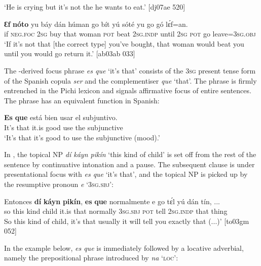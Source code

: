 \glt ‘He is crying but it’s not the he wants to eat.’ [dj07ae 520]
\z


\ea%
    \label{ex:key:712}
    \gll \textbf{Ɛf}  \textbf{nóto}  yu  báy  dán  húman  go  bít    yú    sóté  
yu  go  gó  lɛ́f=an.\\
if  \textsc{neg}.\textsc{foc}  \textsc{2sg}  buy  that  woman  \textsc{pot}  beat    \textsc{2sg.indp}  until
\textsc{2sg}  \textsc{pot}  go  leave=\textsc{3sg.obj}\\

\glt ‘If it’s not that [the correct type] you’ve bought, that woman 
would beat you until you would go return it.’ [ab03ab 033]
\z

The -derived focus phrase \textit{es que} ‘it’s that’ consists of the \textsc{3sg} present tense form of the Spanish copula \textit{ser} and the complementiser \textit{que} ‘that’. The phrase is firmly entrenched in the Pichi lexicon and signals affirmative focus of entire sentences. The phrase has an equivalent function in Spanish:


\ea%
    \label{ex:key:713}
    \gll \textbf{Es}  \textbf{que}   está    bien    usar    el  subjuntivo.\\
It’s  that    it.is    good  use    the  subjunctive\\

\glt ‘It’s that it’s good to use the subjunctive (mood).’
\z

In , the topical \textsc{NP} \textit{dí káyn pikín} ‘this kind of child’ is set off from the rest of the sentence by continuative intonation and a pause. The subsequent clause is under presentational focus with\textit{ es que} ‘it’s that’, and the topical \textsc{NP} is picked up by the resumptive pronoun \textit{e} ‘\textsc{3sg.sbj}’:


\ea%
    \label{ex:key:714}
    \gll Entonces    \textbf{dí}  \textbf{káyn}  \textbf{pikín},  \textbf{es}  \textbf{que}    normalmente
e    go  tɛ́l  yú    dán  tín,  \op...\cp{}\\
so      this  kind    child  it.is  that    normally    
\textsc{3sg.sbj}  \textsc{pot} tell  \textsc{2sg.indp}  that  thing\\

\glt So this kind of child, it’s that usually it will tell you exactly that (...)’ [to03gm 052]
\z

In the example below, \textit{es que} is immediately followed by a locative adverbial, namely the prepositional phrase introduced by \textit{na} ‘\textsc{loc’}:


